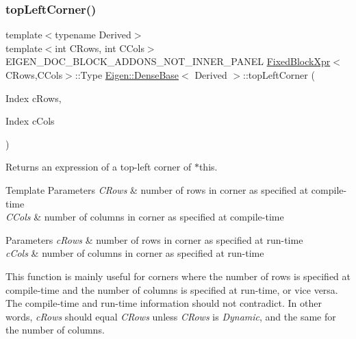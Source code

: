 \subsubsection{\texorpdfstring{topLeftCorner()}{topLeftCorner()}\hspace{0.1cm}{\footnotesize\ttfamily [3/3]}}
{\footnotesize\ttfamily template$<$typename Derived$>$ \\
template$<$int C\+Rows, int C\+Cols$>$ \\
E\+I\+G\+E\+N\+\_\+\+D\+O\+C\+\_\+\+B\+L\+O\+C\+K\+\_\+\+A\+D\+D\+O\+N\+S\+\_\+\+N\+O\+T\+\_\+\+I\+N\+N\+E\+R\+\_\+\+P\+A\+N\+EL \mbox{\hyperlink{struct_eigen_1_1_dense_base_1_1_fixed_block_xpr}{Fixed\+Block\+Xpr}}$<$C\+Rows,C\+Cols$>$\+::Type \mbox{\hyperlink{class_eigen_1_1_dense_base}{Eigen\+::\+Dense\+Base}}$<$ Derived $>$\+::top\+Left\+Corner (\begin{DoxyParamCaption}\item[{Index}]{c\+Rows,  }\item[{Index}]{c\+Cols }\end{DoxyParamCaption})\hspace{0.3cm}{\ttfamily [inline]}}

\begin{DoxyReturn}{Returns}
an expression of a top-\/left corner of $\ast$this.
\end{DoxyReturn}

\begin{DoxyTemplParams}{Template Parameters}
{\em C\+Rows} & number of rows in corner as specified at compile-\/time \\
\hline
{\em C\+Cols} & number of columns in corner as specified at compile-\/time \\
\hline
\end{DoxyTemplParams}

\begin{DoxyParams}{Parameters}
{\em c\+Rows} & number of rows in corner as specified at run-\/time \\
\hline
{\em c\+Cols} & number of columns in corner as specified at run-\/time\\
\hline
\end{DoxyParams}
This function is mainly useful for corners where the number of rows is specified at compile-\/time and the number of columns is specified at run-\/time, or vice versa. The compile-\/time and run-\/time information should not contradict. In other words, {\itshape c\+Rows} should equal {\itshape C\+Rows} unless {\itshape C\+Rows} is {\itshape Dynamic}, and the same for the number of columns.

